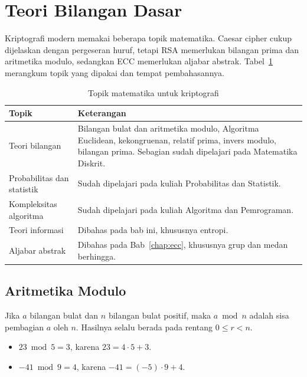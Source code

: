 \section{Teori Bilangan Dasar}
\label{sec:teori-bilangan}

Kriptografi modern memakai beberapa topik matematika. Caesar cipher cukup
dijelaskan dengan pergeseran huruf, tetapi RSA memerlukan bilangan prima dan
aritmetika modulo, sedangkan ECC memerlukan aljabar abstrak. Tabel~\ref{tab:peta-matematika}
merangkum topik yang dipakai dan tempat pembahasannya.

\begin{table}[htbp]
    \centering
    \caption{Topik matematika untuk kriptografi}
    \label{tab:peta-matematika}
    \small
    \begin{tabularx}{\linewidth}{@{}>{\raggedright\arraybackslash}p{4.2cm}
                                  >{\raggedright\arraybackslash}X@{}}
        \hline
        \textbf{Topik} & \textbf{Keterangan} \\
        \hline
        Teori bilangan & Bilangan bulat dan aritmetika modulo, Algoritma Euclidean,
        kekongruenan, relatif prima, invers modulo, bilangan prima. Sebagian sudah
        dipelajari pada Matematika Diskrit. \\
        \hline
        Probabilitas dan statistik & Sudah dipelajari pada kuliah Probabilitas dan
        Statistik. \\
        \hline
        Kompleksitas algoritma & Sudah dipelajari pada kuliah Algoritma dan Pemrograman. \\
        \hline
        Teori informasi & Dibahas pada bab ini, khususnya entropi. \\
        \hline
        Aljabar abstrak & Dibahas pada Bab~\ref{chap:ecc}, khususnya grup dan medan
        berhingga. \\
        \hline
    \end{tabularx}
\end{table}

\subsection{Aritmetika Modulo}

Jika $a$ bilangan bulat dan $n$ bilangan bulat positif, maka $a \bmod n$ adalah
sisa pembagian $a$ oleh $n$. Hasilnya selalu berada pada rentang $0 \le r < n$.
\begin{itemize}
    \item $23 \bmod 5 = 3$, karena $23 = 4 \cdot 5 + 3$.
    \item $-41 \bmod 9 = 4$, karena $-41 = (-5) \cdot 9 + 4$.
\end{itemize}

